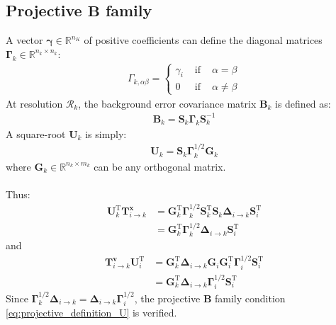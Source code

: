 \documentclass[12pt]{scrartcl}
\begin{document}
\subsection{Projective $\mathbf{B}$ family}
A vector $\boldsymbol{\gamma} \in \mathbb{R}^{n_K}$ of positive coefficients can define the diagonal matrices $\boldsymbol{\Gamma}_k \in \mathbb{R}^{n_k \times n_k}$:
\begin{align}
\Gamma_{k,\alpha \beta} = \left\{
\begin{array}{ccc}
\gamma_i & \text{ if } & \alpha = \beta \\
0 & \text{ if } & \alpha \ne \beta
\end{array}\right.
\end{align}
At resolution $\mathcal{R}_k$, the background error covariance matrix $\mathbf{B}_k$ is defined as:
\begin{align}
\mathbf{B}_k = \mathbf{S}_k \boldsymbol{\Gamma}_k \mathbf{S}_k^{-1}
\end{align}
A square-root $\mathbf{U}_k$ is simply:
\begin{align}
\mathbf{U}_k = \mathbf{S}_k \boldsymbol{\Gamma}_k^{1/2} \mathbf{G}_k
\end{align}
where $\mathbf{G}_k \in \mathbb{R}^{n_k \times m_k}$ can be any orthogonal matrix.\\
$  $\\
Thus:
\begin{align}
\mathbf{U}_k^\mathrm{T} \mathbf{T}^\mathbf{x}_{i \rightarrow k} & = \mathbf{G}^\mathrm{T}_k \boldsymbol{\Gamma}_k^{1/2} \mathbf{S}^\mathrm{T}_k \mathbf{S}_k \boldsymbol{\Delta}_{i \rightarrow k} \mathbf{S}^\mathrm{T}_i \nonumber \\
 & = \mathbf{G}^\mathrm{T}_k \boldsymbol{\Gamma}_k^{1/2}\boldsymbol{\Delta}_{i \rightarrow k} \mathbf{S}^\mathrm{T}_i
\end{align}
and
\begin{align}
\mathbf{T}^\mathbf{v}_{i \rightarrow k} \mathbf{U}_i^\mathrm{T} & = \mathbf{G}^\mathrm{T}_k \boldsymbol{\Delta}_{i \rightarrow k} \mathbf{G}_i \mathbf{G}^\mathrm{T}_i \boldsymbol{\Gamma}_i^{1/2} \mathbf{S}^\mathrm{T}_i \nonumber \\
& = \mathbf{G}^\mathrm{T}_k \boldsymbol{\Delta}_{i \rightarrow k}  \boldsymbol{\Gamma}_i^{1/2} \mathbf{S}^\mathrm{T}_i
\end{align}
Since $\boldsymbol{\Gamma}_k^{1/2}\boldsymbol{\Delta}_{i \rightarrow k} = \boldsymbol{\Delta}_{i \rightarrow k}  \boldsymbol{\Gamma}_i^{1/2}$, the projective $\mathbf{B}$ family condition \eqref{eq:projective_definition_U} is verified.
\end{document}
